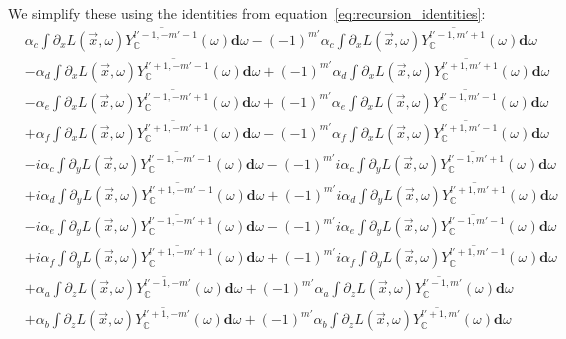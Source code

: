 \documentclass[10pt]{scrartcl}
\begin{document}
We simplify these using the identities from equation~\ref{eq:recursion_identities}: 
\begin{align*}
&
\alpha_c\int{\partial_xL\left (\vec{x} ,\omega \right )\overline{Y_{\mathbb{C}}^{l'-1, -m'-1}}(\omega )\mathbf{d}\omega}
-\left({-1}\right)^{m'}\alpha_c\int{\partial_xL\left (\vec{x} ,\omega \right )\overline{Y_{\mathbb{C}}^{l'-1, m'+1}}(\omega )\mathbf{d}\omega}
\\&
-\alpha_d\int{\partial_xL\left (\vec{x} ,\omega \right )\overline{Y_{\mathbb{C}}^{l'+1, -m'-1}}(\omega )\mathbf{d}\omega}
+\left({-1}\right)^{m'}\alpha_d\int{\partial_xL\left (\vec{x} ,\omega \right )\overline{Y_{\mathbb{C}}^{l'+1, m'+1}}(\omega )\mathbf{d}\omega}
\\&
-\alpha_e\int{\partial_xL\left (\vec{x} ,\omega \right )\overline{Y_{\mathbb{C}}^{l'-1, -m'+1}}(\omega )\mathbf{d}\omega}
+\left({-1}\right)^{m'}\alpha_e\int{\partial_xL\left (\vec{x} ,\omega \right )\overline{Y_{\mathbb{C}}^{l'-1, m'-1}}(\omega )\mathbf{d}\omega}
\\&
+\alpha_f\int{\partial_xL\left (\vec{x} ,\omega \right )\overline{Y_{\mathbb{C}}^{l'+1, -m'+1}}(\omega )\mathbf{d}\omega}
-\left({-1}\right)^{m'}\alpha_f\int{\partial_xL\left (\vec{x} ,\omega \right )\overline{Y_{\mathbb{C}}^{l'+1, m'-1}}(\omega )\mathbf{d}\omega}
\\&
-i \alpha_c\int{\partial_yL\left (\vec{x} ,\omega \right )\overline{Y_{\mathbb{C}}^{l'-1, -m'-1}}(\omega )\mathbf{d}\omega}
-\left({-1}\right)^{m'}i \alpha_c\int{\partial_yL\left (\vec{x} ,\omega \right )\overline{Y_{\mathbb{C}}^{l'-1, m'+1}}(\omega )\mathbf{d}\omega}
\\&
+i \alpha_d\int{\partial_yL\left (\vec{x} ,\omega \right )\overline{Y_{\mathbb{C}}^{l'+1, -m'-1}}(\omega )\mathbf{d}\omega}
+\left({-1}\right)^{m'}i \alpha_d\int{\partial_yL\left (\vec{x} ,\omega \right )\overline{Y_{\mathbb{C}}^{l'+1, m'+1}}(\omega )\mathbf{d}\omega}
\\&
-i \alpha_e\int{\partial_yL\left (\vec{x} ,\omega \right )\overline{Y_{\mathbb{C}}^{l'-1, -m'+1}}(\omega )\mathbf{d}\omega}
-\left({-1}\right)^{m'}i \alpha_e\int{\partial_yL\left (\vec{x} ,\omega \right )\overline{Y_{\mathbb{C}}^{l'-1, m'-1}}(\omega )\mathbf{d}\omega}
\\&
+i \alpha_f\int{\partial_yL\left (\vec{x} ,\omega \right )\overline{Y_{\mathbb{C}}^{l'+1, -m'+1}}(\omega )\mathbf{d}\omega}
+\left({-1}\right)^{m'}i \alpha_f\int{\partial_yL\left (\vec{x} ,\omega \right )\overline{Y_{\mathbb{C}}^{l'+1, m'-1}}(\omega )\mathbf{d}\omega}
\\&
+\alpha_a\int{\partial_zL\left (\vec{x} ,\omega \right )\overline{Y_{\mathbb{C}}^{l'-1, -m'}}(\omega )\mathbf{d}\omega}
+\left({-1}\right)^{m'}\alpha_a\int{\partial_zL\left (\vec{x} ,\omega \right )\overline{Y_{\mathbb{C}}^{l'-1, m'}}(\omega )\mathbf{d}\omega}
\\&
+\alpha_b\int{\partial_zL\left (\vec{x} ,\omega \right )\overline{Y_{\mathbb{C}}^{l'+1, -m'}}(\omega )\mathbf{d}\omega}
+\left({-1}\right)^{m'}\alpha_b\int{\partial_zL\left (\vec{x} ,\omega \right )\overline{Y_{\mathbb{C}}^{l'+1, m'}}(\omega )\mathbf{d}\omega}
\end{align*}
\end{document}
